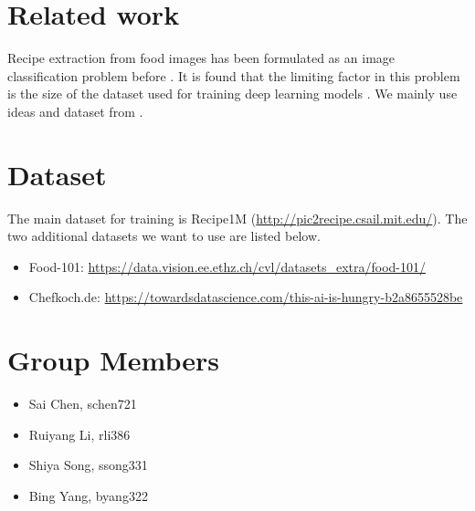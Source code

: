 \documentclass{article}
\begin{document}
\section{Related work}
Recipe extraction from food images has been formulated as an image classification problem before \cite{bossard14}.  It is found that the limiting factor in this problem is the size of the dataset used for training deep learning models \cite{salvador2017learning}.  We mainly use ideas and dataset from \cite{salvador2017learning, marin2019learning}.

\section{Dataset}
The main dataset for training is Recipe1M (\url{http://pic2recipe.csail.mit.edu/}).  The two additional datasets we want to use are listed below.
\begin{itemize}
\item Food-101: \url{https://data.vision.ee.ethz.ch/cvl/datasets_extra/food-101/}
\item Chefkoch.de: \url{https://towardsdatascience.com/this-ai-is-hungry-b2a8655528be}
\end{itemize}

\section{Group Members}
\begin{itemize}
\item{Sai Chen, schen721}
\item{Ruiyang Li, rli386}
\item{Shiya Song, ssong331}
\item{Bing Yang, byang322}
\end{itemize}



\end{document}
